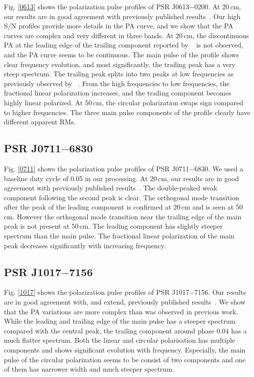 \documentclass[useAMS,usenatbib]{mn2e}
\begin{document}
Fig. \ref{0613} shows the polarization pulse profiles of 
PSR J0613$-$0200.
%
At 20\,cm, our results are in good agreement with previously published
results~\citep{Ord04,Yan11}. 
%
Our high S/N profiles provide more details in the PA curve, and we show that 
the PA curves are complex and very different in three bands. 
%
At 20\,cm, the discontinuous PA at the leading edge of the trailing 
component reported by ~\citet{Yan11} is not observed, and the PA curve seems 
to be continuous.
%
The main pulse of the profile shows clear frequency evolution, and most 
significantly, the trailing peak has a very steep spectrum. The 
trailing peak splits into two peaks at low frequencies as previously 
observed by ~\citet{Stairs99}.
%
From the high frequencies to low frequencies, the fractional linear 
polarization increases, and the trailing component becomes highly linear 
polarized. 
%
At 50\,cm, the circular polarization swaps sign compared to higher 
frequencies.
%
The three main pulse components of the profile clearly have different 
apparent RMs. 

\subsection{PSR J0711$-$6830}

Fig. \ref{0711} shows the polarization pulse profiles 
of PSR J0711$-$6830.
%
We used a baseline duty cycle of 0.05 in our processing.
%
At 20\,cm, our results are in good agreement with previously published
results~\citep{Ord04,Yan11}. 
%
The double-peaked weak component following the second peak is clear.
%
The orthogonal mode transition after the peak of the leading component 
is confirmed at 20\,cm and is seen at 50\,cm.
However the orthogonal mode transition near the trailing edge 
of the main peak is not present at 50\,cm.
%
The leading component has slightly steeper spectrum than the main pulse. 
The fractional linear polarization of the main peak decreases significantly 
with increasing frequency. 


\subsection{PSR J1017$-$7156}

Fig. \ref{1017} shows the polarization pulse profiles of 
PSR J1017$-$7156.
%
Our results are in good agreement with, and extend, previously published 
results~\citep{Keith12}. 
%
We show that the PA variations are more complex than was observed in 
previous work.
%
While the leading and trailing edge of the main pulse has a steeper spectrum 
compared with the central peak, the trailing component around phase 0.04 has
a much flatter spectrum.
%
Both the linear and circular polarisation has multiple components and shows 
significant evolution with frequency. Especially, the main pulse of the 
circular polarization seems to be consist of two components and one of 
them has narrower width and much steeper spectrum.
%
\end{document}
